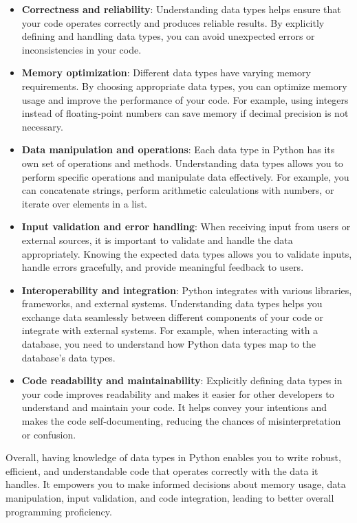 \documentclass[
  letterpaper,
  DIV=11,
  numbers=noendperiod]{scrreprt}
\begin{document}
\begin{itemize}
\item
  \textbf{Correctness and reliability}: Understanding data types helps
  ensure that your code operates correctly and produces reliable
  results. By explicitly defining and handling data types, you can avoid
  unexpected errors or inconsistencies in your code.
\item
  \textbf{Memory optimization}: Different data types have varying memory
  requirements. By choosing appropriate data types, you can optimize
  memory usage and improve the performance of your code. For example,
  using integers instead of floating-point numbers can save memory if
  decimal precision is not necessary.
\item
  \textbf{Data manipulation and operations}: Each data type in Python
  has its own set of operations and methods. Understanding data types
  allows you to perform specific operations and manipulate data
  effectively. For example, you can concatenate strings, perform
  arithmetic calculations with numbers, or iterate over elements in a
  list.
\item
  \textbf{Input validation and error handling}: When receiving input
  from users or external sources, it is important to validate and handle
  the data appropriately. Knowing the expected data types allows you to
  validate inputs, handle errors gracefully, and provide meaningful
  feedback to users.
\item
  \textbf{Interoperability and integration}: Python integrates with
  various libraries, frameworks, and external systems. Understanding
  data types helps you exchange data seamlessly between different
  components of your code or integrate with external systems. For
  example, when interacting with a database, you need to understand how
  Python data types map to the database's data types.
\item
  \textbf{Code readability and maintainability}: Explicitly defining
  data types in your code improves readability and makes it easier for
  other developers to understand and maintain your code. It helps convey
  your intentions and makes the code self-documenting, reducing the
  chances of misinterpretation or confusion.
\end{itemize}

Overall, having knowledge of data types in Python enables you to write
robust, efficient, and understandable code that operates correctly with
the data it handles. It empowers you to make informed decisions about
memory usage, data manipulation, input validation, and code integration,
leading to better overall programming proficiency.
\end{document}

